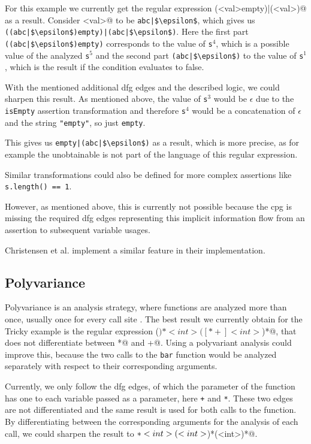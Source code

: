 For this example we currently get the regular expression \Verb@(<val>empty)|(<val>)@ as a result. 
Consider \Verb@<val>@ to be \lstinline[mathescape]@abc|$\epsilon$@, which gives us \lstinline[mathescape]@((abc|$\epsilon$)empty)|(abc|$\epsilon$)@.
Here the first part \lstinline[mathescape]@((abc|$\epsilon$)empty)@ corresponds to the value of \lstinline|s|$^4$, which is a possible value of the analyzed \lstinline|s|$^5$ and the second part \lstinline[mathescape]@(abc|$\epsilon$)@ to the value of \lstinline|s|$^1$, which is the result if the condition evaluates to false.

With the mentioned additional \ac{dfg} edges and the described logic, we could sharpen this result.
As mentioned above, the value of \lstinline|s|$^3$ would be $\epsilon$ due to the \lstinline|isEmpty| assertion transformation and therefore \lstinline|s|$^4$ would be a concatenation of $\epsilon$ and the string \lstinline|"empty"|, so just \lstinline|empty|.

This gives us \lstinline[mathescape]@empty|(abc|$\epsilon$)@ as a result, which is more precise, as for example the unobtainable \Verb@abcempty@ is not part of the language of this regular expression.

Similar transformations could also be defined for more complex assertions like \lstinline|s.length() == 1|.

However, as mentioned above, this is currently not possible because the \ac{cpg} is missing the required \ac{dfg} edges representing this implicit information flow from an assertion to subsequent variable usages. 

Christensen et al. implement a similar feature in their implementation.

\subsection{Polyvariance}\label{sec:futureWork:polyvariance}

Polyvariance is an analysis strategy, where functions are analyzed more than once, usually once for every call site \cite{polyvariance}. The best result we currently obtain for the Tricky example is the regular expression \Verb@(\()*<int>([*+]<int>\))*@, that does not differentiate between \Verb@*@ and \Verb@+@. Using a polyvariant analysis could improve this, because the two calls to the \lstinline|bar| function would be analyzed separately with respect to their corresponding arguments. 

Currently, we only follow the \ac{dfg} edges, of which the parameter of the function has one to each variable passed as a parameter, here \lstinline|+| and \lstinline|*|. These two edges are not differentiated and the same result is used for both calls to the function.
By differentiating between the corresponding arguments for the analysis of each call, we could sharpen the result to \Verb@\(*<int>(\*<int>\))*(\+<int>\))*@.

